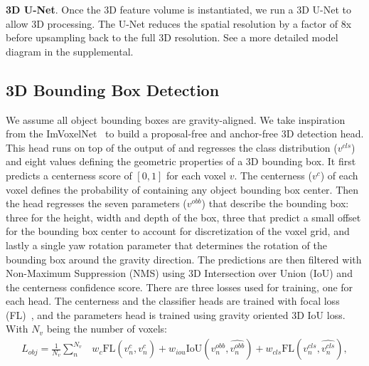 \noindent\textbf{3D U-Net}. Once the 3D feature volume is instantiated, we run a 3D U-Net to allow 3D processing. The U-Net reduces the spatial resolution by a factor of 8x before upsampling back to the full 3D resolution.
See a more detailed model diagram in the supplemental.




\subsection{3D Bounding Box Detection}
%
We assume all object bounding boxes are gravity-aligned. We take inspiration from the ImVoxelNet~\cite{rukhovich2022imvoxelnet} to build a proposal-free and anchor-free 3D detection head. 
This head runs on top of the output of \EFMmodel{} and regresses the class distribution ($v^{cls}$) and eight values defining the geometric properties of a 3D bounding box. 
It first predicts a centerness score of $[0,1]$ for each voxel $v$. The centerness ($v^c$) of each voxel defines the probability of containing any object bounding box center.
%
Then the head regresses the seven parameters ($v^{obb}$) that describe the bounding box: three for the height, width and depth of the box, three that predict a small offset for the bounding box center to account for discretization of the voxel grid, and lastly a single yaw rotation parameter that determines the rotation of the bounding box around the gravity direction.
%
The predictions are then filtered with Non-Maximum Suppression (NMS) using 3D Intersection over Union (IoU) and the centerness confidence score. There are three losses used for training, one for each head. The centerness and the classifier heads are trained with focal loss (FL)~\cite{lin2017focal}, and the parameters head is trained using gravity oriented 3D IoU loss. With $N_v$ being the number of voxels:
\begin{align}\textstyle
    L_{obj} = \frac{1}{N_v}\sum^{N_v}_{n} & w_{c}\text{FL}(v_{n}^{c}, \widehat{v_{n}^{c}}) + w_{iou}\text{IoU}(v_{n}^{obb}, \widehat{v_{n}^{obb}}) + w_{cls}\text{FL}(v_{n}^{cls}, \widehat{v_{n}^{cls}}),
\end{align}


